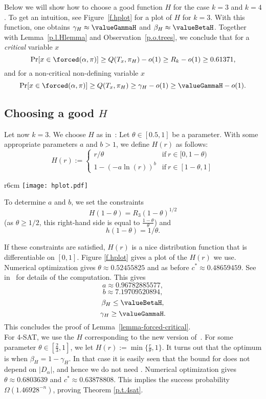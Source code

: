 Below we will show how to choose a good function $H$ for the case
$k=3$ and $k=4$. To get an intuition, see Figure~\ref{f.hplot} for a
plot of $H$ for $k=3$. With this function, one obtains $\gamma_H
\approx \valueGammaH$ and $\beta_H \approx \valueBetaH$.
Together with Lemma~\ref{p.l.Hlemma} and Observation~\ref{p.o.trees},
we conclude that for a {\em critical} variable $x$
$$
 \Pr[x \in \forced(\alpha,\pi)] \geq Q(T_x,\pi_H)-o(1) \geq R_k - o(1)
 \geq 0.61371,
$$
and for a non-critical non-defining variable $x$
$$
\Pr[x \in \forced(\alpha,\pi)] \geq Q(T_x,\pi_H) \geq \gamma_H-o(1)
\geq \valueGammaH - o(1).
$$

\subsection{Choosing a good $H$}

Let now $k=3$. We choose $H$ as in~\cite{rolf2006}: Let $\theta\in [0.5,1]$ be a parameter. With some appropriate parameters $a$ and $b>1$, we define $H(r)$ as follows:
\[H(r):=
\begin{cases}
r/\theta&\mathrm{if\ }r\in [0,1-\theta)\\
1-\left(-a \ln(r)\right)^b&\mathrm{if\ }r\in[1-\theta,1]
\end{cases}
\]
\begin{wrapfigure}{r}{6cm}
\texttt{[image: hplot.pdf]}
\caption{$H(r)$ for 3-SAT}
\label{f.hplot}
\end{wrapfigure}
To determine $a$ and $b$, we set the constraints 
\[H(1-\theta)=R_3(1-\theta)^{1/2}\] 
(as $\theta\geq 1/2$, this right-hand side is equal to $\frac{1-\theta}{\theta}$) and 
\[h(1-\theta)=1/\theta.\]


If these constraints are satisfied, $H(r)$ is a nice distribution function that is differentiable on $[0,1]$. Figure \ref{f.hplot} gives a plot of the $H(r)$ we use. Numerical optimization gives $\theta\approx 0.52455825$ and as before $c^*\approx 0.48659459$. See  in~\cite{thesis} for details of the computation.
This gives
\[a\approx0.96782885577,\]
\[b\approx7.19709520894,\]
\[\beta_H\leq \valueBetaH,\]
\[\gamma_H\geq \valueGammaH.\]
This concludes the proof of Lemma~\ref{lemma-forced-critical}.\\

For 4-SAT, we use the $H$ corresponding to the new version of~\cite{ppsz}. For some parameter $\theta\in[\frac{2}{3},1]$, we let $H(r):=\min\{\frac{r}{\theta},1\}$.
It turns out that the optimum is when $\beta_H=1-\gamma_H$. In that case it is easily seen that the bound for \PPSZ{} does not depend on $|D_\alpha|$, and hence we do not need \Schoening{}.
Numerical optimization gives $\theta\approx 0.6803639$ and $c^*\approx 0.63878808$. This implies the success probability $\Omega\!\left(1.46928^{-n}\right)$, proving Theorem \ref{p.t.4sat}.

